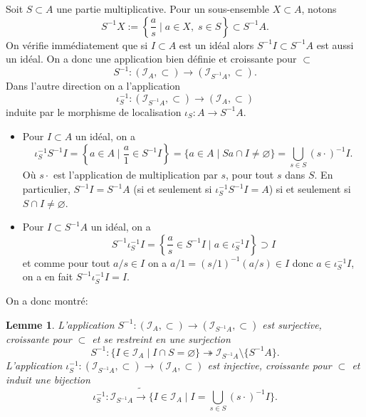 \documentclass[a4paper, oneside, 12pt]{book}
\theoremstyle{theoremeStyle} %
\newtheorem{lemme}[theoreme]{Lemme}
\theoremstyle{definition} %
\begin{document}
 Soit $S\subset A$ une partie multiplicative. Pour un sous-ensemble $X\subset A$, notons $$S^{-1}X:=\left\{  \frac{a}{s}\;|\; a\in X,\; s\in S\right\} \subset S^{-1}A. $$
On vérifie immédiatement que si $I\subset A$ est un idéal alors $S^{-1}I\subset S^{-1}A$ est aussi un idéal. On a donc une application bien définie et croissante pour $\subset$
$$S^{-1}:(\mathcal{I}_A,\subset)\rightarrow (\mathcal{I}_{S^{-1}A},\subset).$$
Dans l'autre direction on a l'application $$\iota_S^{-1}:(\mathcal{I}_{S^{-1}A},\subset)\rightarrow (\mathcal{I}_A,\subset)$$ induite  par le morphisme de localisation $\iota_S:A\rightarrow S^{-1}A$.
\begin{itemize}[leftmargin=* ,parsep=0cm,itemsep=0cm,topsep=0cm]
\item Pour $I\subset A$ un idéal, on a
	$$\iota_S^{-1}S^{-1}I=\left\{ a\in A\;|\; \frac{a}{1}\in S^{-1}I\right\} = \lbrace a\in A\;|\;  Sa\cap I\not=\varnothing\rbrace=\bigcup_{s\in S}(s\cdot)^{-1}I.$$
Où $s\cdot$ est l'application de multiplication par $s$, pour tout $s$ dans $S$. En particulier, $S^{-1}I=S^{-1}A$ (si et seulement si $\iota_S^{-1}S^{-1}I=A$) si et seulement si $S\cap I\not=\varnothing$.\\
\item Pour $I\subset S^{-1}A$ un idéal, on a
	$$S^{-1}\iota_S^{-1}I=\left\{ \frac{a}{s} \in S^{-1}I\;|\; a\in \iota_S^{-1}I\right\}\supset I$$
et comme  pour tout $a/s\in I$ on a $a/1= (s/1)^{-1}(a/s)\in I$ donc $a\in \iota_S^{-1}I$, on a en fait $S^{-1}\iota_S^{-1}I=I$.\\
 \end{itemize}

 On a donc montré:

\label{LocIdeaux}\begin{lemme} L'application $S^{-1}:(\mathcal{I}_A,\subset)\rightarrow (\mathcal{I}_{S^{-1}A},\subset) $ est surjective, croissante pour $\subset$ et se restreint en une surjection    $$S^{-1}:\lbrace I\in\mathcal{I}_A\;|\; I\cap S=\varnothing\rbrace \twoheadrightarrow  \mathcal{I}_{S^{-1}A}\setminus \lbrace S^{-1}A\rbrace . $$
L'application $\iota_S^{-1}:(\mathcal{I}_{S^{-1}A},\subset) \rightarrow  (\mathcal{I}_A,\subset)$ est injective,  croissante pour $\subset$  et induit une bijection
$$\iota_S^{-1}:\mathcal{I}_{S^{-1}A} \tilde{\rightarrow} \lbrace I\in\mathcal{I}_A\;|\; I=\bigcup_{s\in S}(s\cdot)^{-1}I\rbrace .$$\end{lemme}
\end{document}
